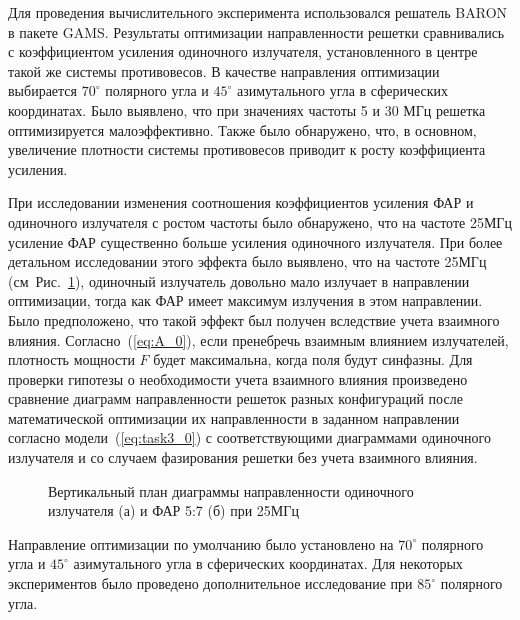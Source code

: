 Для проведения вычислительного эксперимента использовался решатель BARON в пакете GAMS. Результаты оптимизации направленности решетки сравнивались с коэффициентом усиления одиночного излучателя, установленного в центре такой же системы противовесов. В качестве направления оптимизации выбирается $70^{\circ}$ полярного угла и $45^{\circ}$ азимутального угла в сферических координатах. Было выявлено, что при значениях частоты 5 и 30 МГц решетка оптимизируется малоэффективно. Также было обнаружено, что, в основном, увеличение плотности системы противовесов приводит к росту коэффициента усиления.

При исследовании изменения соотношения коэффициентов усиления ФАР и одиночного излучателя с ростом частоты было обнаружено, что на частоте 25МГц усиление ФАР существенно больше усиления одиночного излучателя. При более детальном исследовании этого эффекта было выявлено, что на частоте 25МГц (см~Рис.~\ref{ris:f25mhs_0}), одиночный излучатель довольно мало излучает в направлении оптимизации, тогда как ФАР имеет максимум излучения в этом направлении. Было предположено, что такой эффект был получен вследствие учета взаимного влияния. Согласно~(\ref{eq:A_0}), если пренебречь взаимным влиянием излучателей, плотность мощности $F$ будет максимальна, когда поля будут синфазны. Для проверки гипотезы о необходимости учета взаимного влияния произведено сравнение диаграмм направленности решеток разных конфигураций после математической оптимизации их направленности в заданном направлении согласно модели~(\ref{eq:task3_0}) с соответствующими диаграммами одиночного излучателя и со случаем фазирования решетки без учета взаимного влияния.

\begin{figure}[!h]
\begin{minipage}[h]{0.49\linewidth}
\end{minipage}
\hfill
\begin{minipage}[h]{0.49\linewidth}
\end{minipage}
\caption{Вертикальный план диаграммы направленности одиночного излучателя (а) и ФАР 5:7 (б) при 25МГц}
\label{ris:f25mhs_0}
\end{figure}

Направление оптимизации по умолчанию было установлено на $70^{\circ}$ полярного угла и $45^{\circ}$ азимутального угла в сферических координатах. Для некоторых экспериментов было проведено дополнительное исследование при $85^{\circ}$ полярного угла.


